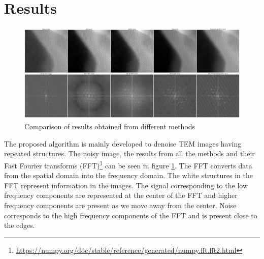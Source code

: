 \documentclass[fleqn,10pt]{wlscirep}
\begin{document}


\section*{Results}

\begin{figure}
	\centering
	\includegraphics[scale=0.09]{./imgs/comparison.jpg}
	\caption{Comparison of results obtained from different methods}
	\label{fig:comparison}
\end{figure}


The proposed algorithm is mainly developed to denoise TEM images having repeated structures. The noisy image, the results from all the methods and their Fast Fourier transforms (FFT)\footnote{\url{https://numpy.org/doc/stable/reference/generated/numpy.fft.fft2.html}} can be seen in figure \ref{fig:comparison}. The FFT converts data from the spatial domain into the frequency domain. The white structures in the FFT represent information in the images. The signal corresponding to the low frequency components are represented at the center of the FFT and higher frequency components are present as we move away from the center. Noise corresponds to the high frequency components of the FFT and is present close to the edges.
\end{document}
